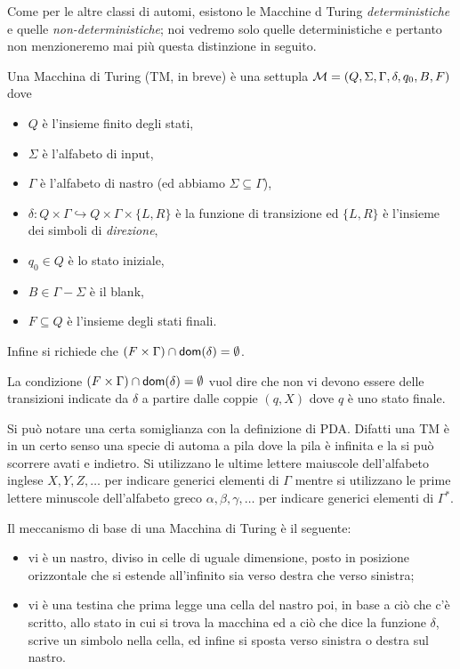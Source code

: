 \documentclass[runningheads,a4paper]{llncs}
\begin{document}
Come per le altre classi di automi, esistono le Macchine d Turing \emph{deterministiche} e quelle \emph{non-deterministiche}; noi vedremo solo quelle deterministiche e pertanto non menzioneremo mai pi\`{u} questa distinzione in seguito.

\begin{definition}[TM]\label{def:TM}
Una Macchina di Turing (TM, in breve) \`{e} una settupla $\mathcal{M} = (Q,\Sigma,\Gamma,\delta,q_0,B,F)$ dove 
\begin{itemize}
\item $Q$ \`{e} l'insieme finito degli stati,
\item $\Sigma$ \`{e} l'alfabeto di input,
\item $\Gamma$ \`{e} l'alfabeto di nastro (ed abbiamo $\Sigma \subseteq \Gamma$),
\item $\delta: Q\times\Gamma \hookrightarrow Q\times\Gamma\times\{L,R\}$ \`{e} la funzione di transizione ed $\{L,R\}$ \`{e} l'insieme dei simboli di \emph{direzione},
\item $q_0 \in Q$ \`{e} lo stato iniziale,
\item $B \in \Gamma - \Sigma$ \`{e} il blank,
\item $F \subseteq Q$ \`{e} l'insieme degli stati finali.
\end{itemize}
Infine si richiede che $(F \times \Gamma) \cap \mathsf{dom}(\delta) = \emptyset$.
\end{definition}

La condizione $(F \times \Gamma) \cap \mathsf{dom}(\delta) = \emptyset$ vuol dire che non vi devono essere delle transizioni indicate da $\delta$ a partire dalle coppie $(q,X)$ dove $q$ \`{e} uno stato finale.

Si pu\`{o} notare una certa somiglianza con la definizione di PDA. Difatti una TM \`{e} in un certo senso una specie di automa a pila dove la pila \`{e} infinita e la si pu\`{o} scorrere avati e indietro. Si utilizzano le ultime lettere maiuscole dell'alfabeto inglese $X,Y,Z,\ldots$ per indicare generici elementi di $\Gamma$ mentre si utilizzano le prime lettere minuscole dell'alfabeto greco $\alpha,\beta,\gamma,\ldots$ per indicare generici elementi di $\Gamma^*$.

Il meccanismo di base di una Macchina di Turing \`{e} il seguente:
\begin{itemize}
\item vi \`{e} un nastro, diviso in celle di uguale dimensione, posto in posizione orizzontale che si estende all'infinito sia verso destra che verso sinistra;
\item vi \`{e} una testina che prima legge una cella del nastro poi, in base a ci\`{o} che c'\`{e} scritto, allo stato in cui si trova la macchina ed a ci\`{o} che dice la funzione $\delta$, scrive un simbolo nella cella, ed infine si sposta verso sinistra o destra sul nastro.
\end{itemize}
\end{document}
